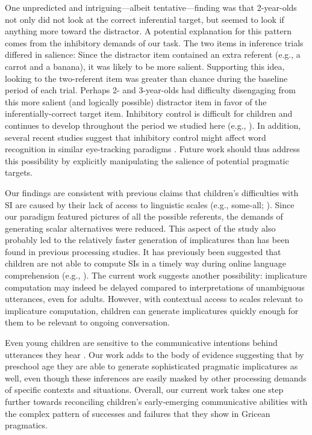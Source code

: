 \documentclass[10pt,letterpaper]{article}
\begin{document}
One unpredicted and intriguing---albeit tentative---finding was that 2-year-olds not only did not look at the correct inferential target, but seemed to look if anything more toward the distractor. A potential explanation for this pattern comes from the inhibitory demands of our task. The two items in inference trials differed in salience: Since the distractor item contained an extra referent (e.g., a carrot and a banana), it was likely to be more salient. Supporting this idea, looking to the two-referent item was greater than chance during the baseline period of each trial. Perhaps 2- and 3-year-olds had difficulty disengaging from this more salient (and logically possible) distractor item in favor of the inferentially-correct target item. Inhibitory control is difficult for children and continues to develop throughout the period we studied here (e.g.,  ). In addition, several recent studies suggest that inhibitory control might affect word recognition in similar eye-tracking paradigms \cite{yurovskybeyond,nordmeyer2013measuring}. Future work should thus address this possibility by explicitly manipulating the salience of potential pragmatic targets.

Our findings are consistent with previous claims that children's difficulties with SI are caused by their lack of access to linguistic scales (e.g., some-all; ). Since our paradigm featured pictures of all the possible referents, the demands of generating scalar alternatives were reduced. This aspect of the study also probably led to the relatively faster generation of implicatures than has been found in previous processing studies. It has previously been suggested that children are not able to compute SIs in a timely way during online language comprehension (e.g., ). The current work suggests another possibility: implicature computation may indeed be delayed compared to interpretations of unambiguous utterances, even for adults. However, with contextual access to scales relevant to implicature computation, children can generate implicatures quickly enough for them to be relevant to ongoing conversation. 

Even young children are sensitive to the communicative intentions behind utterances they hear \cite{clark2009first,baldwin1993early}. Our work adds to the body of evidence suggesting that by preschool age they are able to generate sophisticated pragmatic implicatures as well, even though these inferences are easily masked by other processing demands of specific contexts and situations. Overall, our current work takes one step further towards reconciling children's early-emerging communicative abilities with the complex pattern of successes and failures that they show in Gricean pragmatics.
\end{document}

